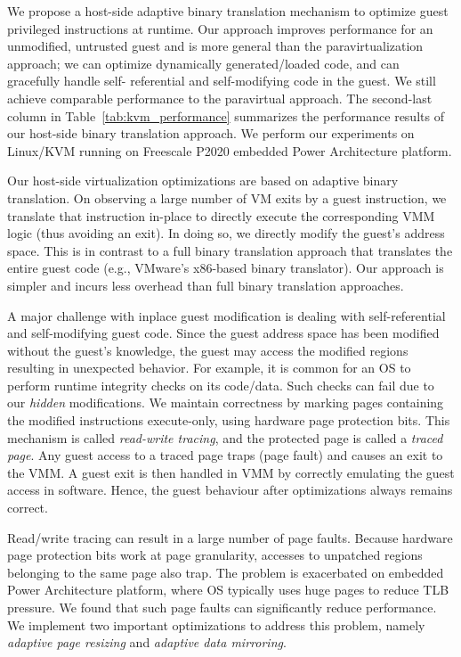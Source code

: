 We propose a host-side adaptive binary translation mechanism to optimize guest privileged instructions at runtime. Our approach improves performance for an unmodified, untrusted guest and is more general than the paravirtualization approach; we can optimize dynamically generated/loaded code, and can gracefully handle self- referential and self-modifying code in the guest. We still achieve comparable performance to the paravirtual approach. The second-last column in Table~\ref{tab:kvm_performance} summarizes the performance results of our host-side binary translation approach. We perform our experiments on Linux/KVM running on Freescale P2020 embedded Power Architecture platform.

Our host-side virtualization optimizations are based on adaptive binary translation. On observing a large number of VM exits by a guest instruction, we translate that instruction in-place to directly execute the corresponding VMM logic (thus avoiding an exit). In doing so, we directly modify the guest’s address space. This is in contrast to a full binary translation approach that translates the entire guest code (e.g., VMware’s x86-based binary translator\cite{adams:asplos06}). Our approach is simpler and incurs less overhead than full binary translation approaches.

A major challenge with inplace guest modification is dealing with self-referential and self-modifying guest code. Since the guest address space has been modified without the guest's knowledge, the guest may access the modified regions resulting in unexpected behavior. For example, it is common for an OS to perform runtime integrity checks on its code/data. Such checks can fail due to our {\em hidden} modifications.
We maintain correctness by marking pages containing the modified instructions execute-only, using hardware page protection bits. This mechanism is
called {\em read-write tracing}, and the protected page is called
a {\em traced page}. Any guest access to a traced page
traps (page fault) and causes an exit to the VMM. A guest exit is then
handled in VMM by correctly emulating the guest access in software.
Hence, the guest behaviour after optimizations always remains correct.

Read/write tracing can result in a large number of page faults.
Because hardware page protection bits work at page granularity, accesses
to unpatched regions belonging to the same page also trap.
The problem is exacerbated on embedded Power Architecture platform, where OS
typically uses huge pages to reduce TLB pressure. We found that such page
faults can significantly reduce performance. We implement two important
optimizations to address this problem, namely {\em adaptive page resizing}
and {\em adaptive data mirroring}.

